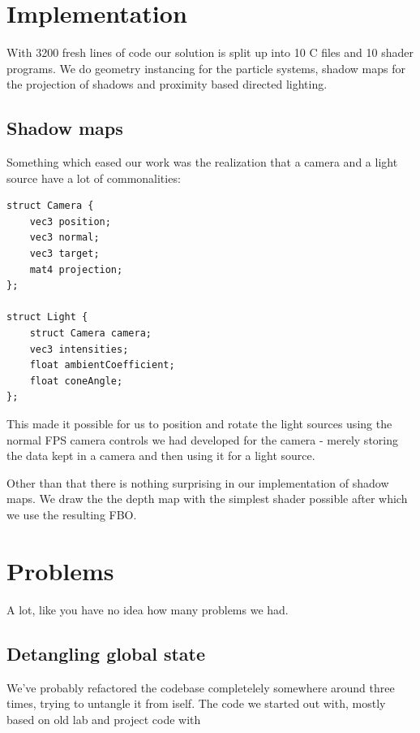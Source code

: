 \documentclass[a4paper,12pt]{article}
\begin{document}
\section{Implementation}

With 3200 fresh lines of code our solution is split up into 10 C files and 10 shader programs. We do geometry instancing for the particle systems, shadow maps for the projection of shadows and proximity based directed lighting.


\subsection{Shadow maps}

Something which eased our work was the realization that a camera and a light source have a lot of commonalities:

\begin{lstlisting}[float,label=lst:lamp-struct,caption=nextHopInfo: Light source struct]
struct Camera {
	vec3 position;
	vec3 normal;
	vec3 target;
	mat4 projection;
};

struct Light {
	struct Camera camera;
	vec3 intensities;
	float ambientCoefficient;
	float coneAngle;
};
\end{lstlisting}

This made it possible for us to position and rotate the light sources using the normal FPS camera controls we had developed for the camera - merely storing the data kept in a camera and then using it for a light source.

Other than that there is nothing surprising in our implementation of shadow maps. We draw the the depth map with the simplest shader possible after which we use the resulting FBO.


\section{Problems}

A lot, like you have no idea how many problems we had.

\subsection{Detangling global state}

We've probably refactored the codebase completelely somewhere around three times, trying to untangle it from iself. The code we started out with, mostly based on old lab and project code with
\end{document}
